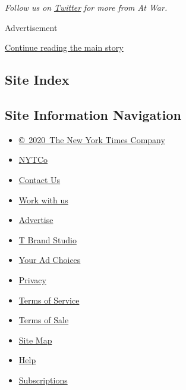 \emph{Follow us on}
\href{https://twitter.com/NYTimesAtWar}{\emph{Twitter}} \emph{for more
from At War.}

Advertisement

\protect\hyperlink{after-bottom}{Continue reading the main story}

\hypertarget{site-index}{%
\subsection{Site Index}\label{site-index}}

\hypertarget{site-information-navigation}{%
\subsection{Site Information
Navigation}\label{site-information-navigation}}

\begin{itemize}
\tightlist
\item
  \href{https://help.nytimes.com/hc/en-us/articles/115014792127-Copyright-notice}{©~2020~The
  New York Times Company}
\end{itemize}

\begin{itemize}
\tightlist
\item
  \href{https://www.nytco.com/}{NYTCo}
\item
  \href{https://help.nytimes.com/hc/en-us/articles/115015385887-Contact-Us}{Contact
  Us}
\item
  \href{https://www.nytco.com/careers/}{Work with us}
\item
  \href{https://nytmediakit.com/}{Advertise}
\item
  \href{http://www.tbrandstudio.com/}{T Brand Studio}
\item
  \href{https://www.nytimes.com/privacy/cookie-policy\#how-do-i-manage-trackers}{Your
  Ad Choices}
\item
  \href{https://www.nytimes.com/privacy}{Privacy}
\item
  \href{https://help.nytimes.com/hc/en-us/articles/115014893428-Terms-of-service}{Terms
  of Service}
\item
  \href{https://help.nytimes.com/hc/en-us/articles/115014893968-Terms-of-sale}{Terms
  of Sale}
\item
  \href{https://spiderbites.nytimes.com}{Site Map}
\item
  \href{https://help.nytimes.com/hc/en-us}{Help}
\item
  \href{https://www.nytimes.com/subscription?campaignId=37WXW}{Subscriptions}
\end{itemize}
